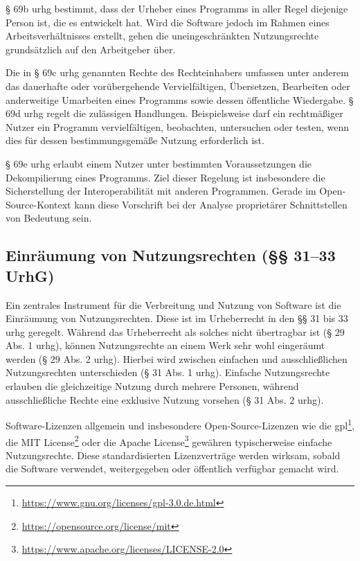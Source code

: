 § 69b \gls{urhg} bestimmt, dass der Urheber eines Programms in aller Regel diejenige Person ist, die es entwickelt hat.
Wird die Software jedoch im Rahmen eines Arbeitsverhältnisses erstellt, gehen die uneingeschränkten Nutzungsrechte grundsätzlich auf den Arbeitgeber über.

Die in § 69c \gls{urhg} genannten Rechte des Rechteinhabers umfassen unter anderem das dauerhafte oder vorübergehende Vervielfältigen, Übersetzen, Bearbeiten oder anderweitige Umarbeiten eines Programms sowie dessen öffentliche Wiedergabe.
§ 69d \gls{urhg} regelt die zulässigen Handlungen.
Beispielsweise darf ein rechtmäßiger Nutzer ein Programm vervielfältigen, beobachten, untersuchen oder testen, wenn dies für dessen bestimmungsgemäße Nutzung erforderlich ist.

§ 69e \gls{urhg} erlaubt einem Nutzer unter bestimmten Voraussetzungen die Dekompilierung eines Programms.
Ziel dieser Regelung ist insbesondere die Sicherstellung der Interoperabilität mit anderen Programmen.
Gerade im Open-Source-Kontext kann diese Vorschrift bei der Analyse proprietärer Schnittstellen von Bedeutung sein.


\subsection{Einräumung von Nutzungsrechten (§§ 31–33 UrhG)}

Ein zentrales Instrument für die Verbreitung und Nutzung von Software ist die Einräumung von Nutzungsrechten.
Diese ist im Urheberrecht in den §§ 31 bis 33 \gls{urhg} geregelt.
Während das Urheberrecht als solches nicht übertragbar ist (§ 29 Abs. 1 \gls{urhg}), können Nutzungsrechte an einem Werk sehr wohl eingeräumt werden (§ 29 Abs. 2 \gls{urhg}).
Hierbei wird zwischen einfachen und ausschließlichen Nutzungsrechten unterschieden (§ 31 Abs. 1 \gls{urhg}).
Einfache Nutzungsrechte erlauben die gleichzeitige Nutzung durch mehrere Personen, während ausschließliche Rechte eine exklusive Nutzung vorsehen (§ 31 Abs. 2 \gls{urhg}).

Software-Lizenzen allgemein und insbesondere Open-Source-Lizenzen wie die \gls{gpl}\footnote{\url{https://www.gnu.org/licenses/gpl-3.0.de.html}}, die MIT License\footnote{\url{https://opensource.org/license/mit}} oder die Apache
License\footnote{\url{https://www.apache.org/licenses/LICENSE-2.0}} gewähren typischerweise einfache Nutzungsrechte.
Diese standardisierten Lizenzverträge werden wirksam, sobald die Software verwendet, weitergegeben oder öffentlich verfügbar gemacht wird.

